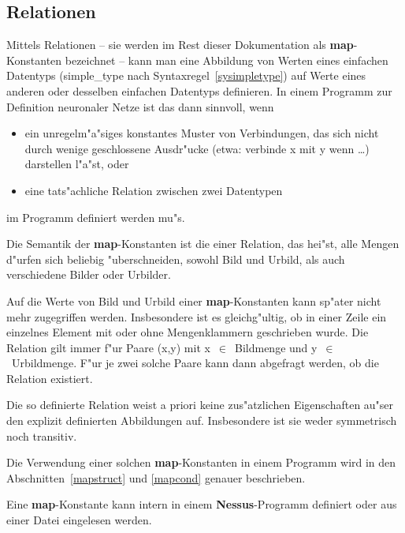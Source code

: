 \subsection{Relationen}
\label{Relationen}

Mittels Relationen -- sie werden im Rest dieser Dokumentation als {\bf
map}-Konstanten bezeichnet -- kann man eine
Abbildung von Werten eines einfachen Datentyps (simple\_type nach
Syntaxregel~\ref{sysimpletype}) auf Werte eines anderen oder desselben
einfachen Datentyps definieren. In einem Programm zur Definition
neuronaler Netze ist das dann sinnvoll, wenn

\begin{itemize}
\item ein unregelm"a"siges konstantes Muster von
Verbindungen,
das sich nicht durch wenige geschlossene Ausdr"ucke (etwa:
verbinde x mit y wenn \dots) darstellen l"a"st, oder

\item eine tats"achliche Relation zwischen zwei Datentypen 
\end{itemize}
im Programm definiert werden mu"s.

Die Semantik der {\bf map}-Konstanten ist die einer
Relation, das hei"st, alle Mengen d"urfen sich beliebig
"uberschneiden, sowohl Bild und Urbild, als auch verschiedene Bilder
oder Urbilder.

Auf die Werte von Bild und Urbild einer {\bf map}-Konstanten
 kann sp"ater nicht mehr zugegriffen werden.  Insbesondere
ist es gleichg"ultig, ob in einer Zeile ein einzelnes Element mit oder
ohne Mengenklammern geschrieben wurde. Die Relation
 gilt immer f"ur Paare (x,y) mit
x~$\in$~Bildmenge und y~$\in$~Urbildmenge. F"ur je zwei solche Paare
kann dann abgefragt werden, ob die Relation existiert.

Die so definierte Relation weist a priori keine zus"atzlichen
Eigenschaften au"ser den explizit definierten Abbildungen auf.
Insbesondere ist sie weder symmetrisch noch transitiv.

Die Verwendung einer solchen {\bf map}-Konstanten 
 in einem Programm wird in den
Abschnitten~\ref{mapstruct} und \ref{mapcond} genauer beschrieben.

Eine {\bf map}-Konstante kann intern in einem {\bf
Nessus}-Programm definiert oder aus einer Datei eingelesen werden.

